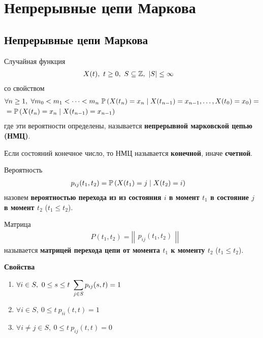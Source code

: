 \newpage
{}
\section{Непрерывные цепи Маркова}
\subsection{Непрерывные цепи Маркова}
\begin{Def}
    Случайная функция
    \begin{align*}
      & X(t), \ t \geq 0, \ S \subseteq \mathbb{Z}, \ \left| S \right| \leq \infty
    \end{align*}
    со свойством
    \begin{align*}
      & \forall n \geq 1, \ \forall m_0 < m_1 < \dots < m_n \ \mathbb{P}\left( X(t_n) = x_n \mid X(t_{n-1}) = x_{n-1}, \dots, X(t_0) = x_0 \right) = \\
      & = \mathbb{P}\left( X(t_{n}) = x_n \mid X(t_{n-1}) = x_{n-1}\right)
    \end{align*}
    где эти вероятности определены, называется \textbf{непрерывной марковской
      цепью (НМЦ)}.
\end{Def}
\begin{Def}
    Если состояний конечное число, то НМЦ называется \textbf{конечной}, иначе \textbf{счетной}.
\end{Def}
\begin{Def}
    Вероятность
    \begin{align*}
      & p_{ij}(t_1,t_2) = \mathbb{P} \left( X(t_1)=j \mid X(t_2) = i\right)
    \end{align*}
    назовем \textbf{вероятностью перехода из из состояния $i$ в момент $t_1$ в
      состояние $j$ в момент $t_2$} ($t_1 \leq t_2$).
\end{Def}
\begin{Def}
    Матрица
    \begin{align*}
      & P(t_1,t_2) = \left| \left| \begin{matrix} p_{ij}(t_1,t_2) \end{matrix} \right| \right|
    \end{align*}
    называется \textbf{матрицей перехода цепи от момента $t_1$ к моменту $t_2$}
    ($t_1 \leq t_2$).
\end{Def}
\textbf{Свойства}
\begin{enumerate}
    \item $\forall i \in S, \ 0 \leq s \leq t \ \dst \sum_{j \in S} p_{ij}(s,t) = 1$
    \item $\forall i \in S, \ 0 \leq t \ p_{ii}(t,t) = 1$
    \item $\forall i \neq j \in S, \ 0 \leq t \ p_{ij}(t,t) = 0$
\end{enumerate}
